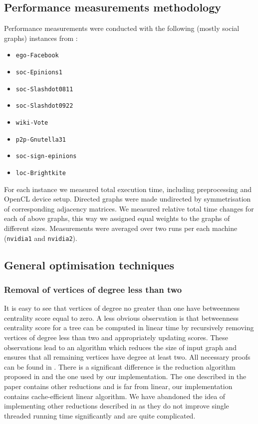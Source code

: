 \subsection*{Performance measurements methodology}

Performance measurements were conducted with the following (mostly social graphs) instances from \cite{Snap}:
\begin{itemize}
  \item \verb+ego-Facebook+
  \item \verb+soc-Epinions1+
  \item \verb+soc-Slashdot0811+
  \item \verb+soc-Slashdot0922+
  \item \verb+wiki-Vote+
  \item \verb+p2p-Gnutella31+
  \item \verb+soc-sign-epinions+
  \item \verb+loc-Brightkite+
\end{itemize}
For each instance we measured total execution time, including preprocessing and OpenCL device setup.
Directed graphs were made undirected by symmetrisation of corresponding adjacency matrices.
We measured relative total time changes for each of above graphs, this way we assigned equal weights to the graphs of different sizes.
Measurements were averaged over two runs per each machine (\verb+nvidia1+ and \verb+nvidia2+).

\subsection*{General optimisation techniques}

\subsubsection*{Removal of vertices of degree less than two}

It is easy to see that vertices of degree no greater than one have betweenness centrality score equal to zero.
A less obvious observation is that betweenness centrality score for a tree can be computed in linear time by recursively removing vertices of degree less than two and appropriately updating scores.
These observations lead to an algorithm which reduces the size of input graph and ensures that all remaining vertices have degree at least two.
All necessary proofs can be found in \cite{GraphComp}.
There is a significant difference is the reduction algorithm proposed in \cite{GraphComp} and the one used by our implementation.
The one described in the paper contains other reductions and is far from linear, our implementation contains cache-efficient linear algorithm.
We have abandoned the idea of implementing other reductions described in \cite{GraphComp} as they do not improve single threaded running time significantly and are quite complicated.

